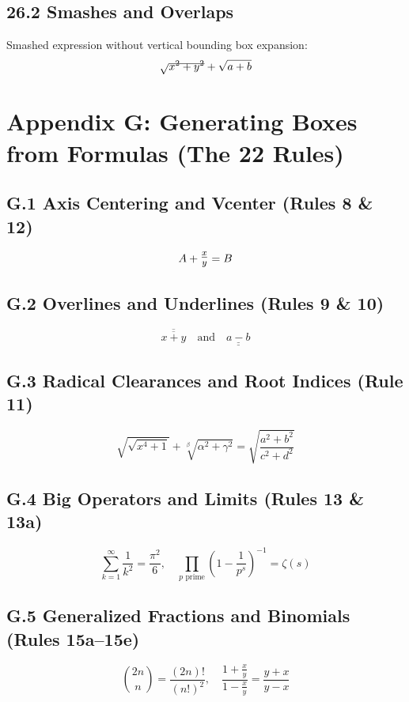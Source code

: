 \documentclass{article}
\begin{document}
\subsection*{26.2 Smashes and Overlaps}
Smashed expression without vertical bounding box expansion:
\begin{equation}
\sqrt{\smash{x^2 + y^2}} + \sqrt{a + b}
\end{equation}

\section*{Appendix G: Generating Boxes from Formulas (The 22 Rules)}

\subsection*{G.1 Axis Centering and Vcenter (Rules 8 \& 12)}
\begin{equation}
A + \vcenter{\hbox{\large$\frac{x}{y}$}} = B
\end{equation}

\subsection*{G.2 Overlines and Underlines (Rules 9 \& 10)}
\begin{equation}
\overline{\overline{x + y}} \quad \text{and} \quad \underline{\underline{a - b}}
\end{equation}

\subsection*{G.3 Radical Clearances and Root Indices (Rule 11)}
\begin{equation}
\sqrt{\sqrt{x^4 + 1}} + \sqrt[\beta]{\alpha^2 + \gamma^2} = \sqrt{\frac{a^2 + b^2}{c^2 + d^2}}
\end{equation}

\subsection*{G.4 Big Operators and Limits (Rules 13 \& 13a)}
\begin{equation}
\sum_{k=1}^\infty \frac{1}{k^2} = \frac{\pi^2}{6}, \quad \prod_{p \text{ prime}} \left(1 - \frac{1}{p^s}\right)^{-1} = \zeta(s)
\end{equation}

\subsection*{G.5 Generalized Fractions and Binomials (Rules 15a--15e)}
\begin{equation}
\binom{2n}{n} = \frac{(2n)!}{(n!)^2}, \quad \frac{1 + \frac{x}{y}}{1 - \frac{x}{y}} = \frac{y + x}{y - x}
\end{equation}
\end{document}
